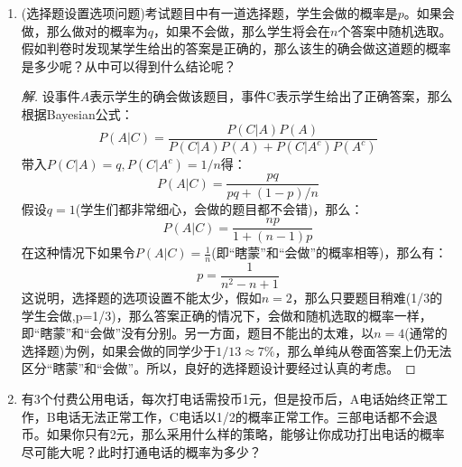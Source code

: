 \documentclass[12pt]{article}
\newcommand{\hei}{\CJKfamily{hei}}                          %
\begin{document}
\begin{enumerate}
\item {\hei (选择题设置选项问题)考试题目中有一道选择题，学生会做的概率是$p$。如果会做，那么做对的概率为$q$，如果不会做，那么学生将会在$n$个答案中随机选取。假如判卷时发现某学生给出的答案是正确的，那么该生的确会做这道题的概率是多少呢？从中可以得到什么结论呢？}
\begin{proof}[解]
	设事件$A$表示学生的确会做该题目，事件C表示学生给出了正确答案，那么根据Bayesian公式：
	\begin{equation}
	P(A|C)=\frac{P(C|A)P(A)}{P(C|A)P(A)+P(C|A^c)P(A^c)}
	\end{equation}
	带入$P(C|A)=q,P(C|A^c)=1/n$得：
	\begin{equation}
	P(A|C)=\frac{pq}{pq+(1-p)/n}
	\end{equation}
	假设$q=1$(学生们都非常细心，会做的题目都不会错)，那么：
	\begin{equation}
	P(A|C)=\frac{np}{1+(n-1)p}
	\end{equation}
	在这种情况下如果令$P(A|C)=\frac{1}{n}$(即“瞎蒙”和“会做”的概率相等)，那么有：
	\begin{equation}
	p=\frac{1}{n^2-n+1}
	\end{equation}
	这说明，选择题的选项设置不能太少，假如$n=2$，那么只要题目稍难(1/3的学生会做,p=1/3)，那么答案正确的情况下，会做和随机选取的概率一样，即“瞎蒙”和“会做”没有分别。另一方面，题目不能出的太难，以$n=4$(通常的选择题)为例，如果会做的同学少于$1/13\approx 7\%$，那么单纯从卷面答案上仍无法区分“瞎蒙”和“会做”。所以，良好的选择题设计要经过认真的考虑。
\end{proof}

\item {\hei 有3个付费公用电话，每次打电话需投币1元，但是投币后，A电话始终正常工作，B电话无法正常工作，C电话以1/2的概率正常工作。三部电话都不会退币。如果你只有2元，那么采用什么样的策略，能够让你成功打出电话的概率尽可能大呢？此时打通电话的概率为多少？}


\end{enumerate}
\end{document}
